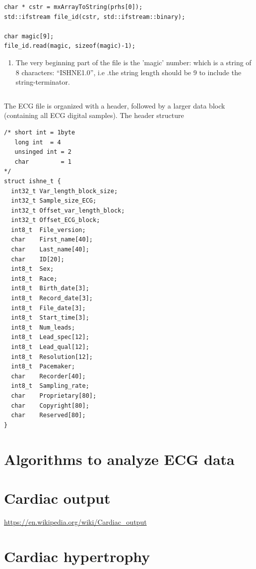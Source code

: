 \begin{Verbatim}
char * cstr = mxArrayToString(prhs[0]);
std::ifstream file_id(cstr, std::ifstream::binary);

char magic[9];
file_id.read(magic, sizeof(magic)-1);

\end{Verbatim}
\begin{enumerate}
  \item The very beginning part of the file is the 'magic' number: which is a
  string of 8 characters: ``ISHNE1.0'', i.e .the string length should be 9 to
  include the string-terminator.
\begin{verbatim}

\end{verbatim}
\end{enumerate}

The ECG file is organized with a header, followed by a larger data block
(containing all ECG digital samples). 
The header structure
\begin{verbatim}
/* short int = 1byte
   long int  = 4
   unsinged int = 2
   char         = 1
*/
struct ishne_t {
  int32_t Var_length_block_size;
  int32_t Sample_size_ECG;
  int32_t Offset_var_length_block;
  int32_t Offset_ECG_block;
  int8_t  File_version;
  char    First_name[40];
  char    Last_name[40];
  char    ID[20];
  int8_t  Sex;
  int8_t  Race;
  int8_t  Birth_date[3];
  int8_t  Record_date[3];
  int8_t  File_date[3];
  int8_t  Start_time[3];
  int8_t  Num_leads;
  int8_t  Lead_spec[12];
  int8_t  Lead_qual[12];
  int8_t  Resolution[12];
  int8_t  Pacemaker;
  char    Recorder[40];
  int8_t  Sampling_rate;
  char    Proprietary[80];
  char    Copyright[80];
  char    Reserved[80];
}
\end{verbatim}


\section{Algorithms to analyze ECG data}



\section{Cardiac output}
\label{sec:cardiac-output}

\url{https://en.wikipedia.org/wiki/Cardiac_output}

\section{Cardiac hypertrophy}
\label{sec:cardiac-hypertrophy}

